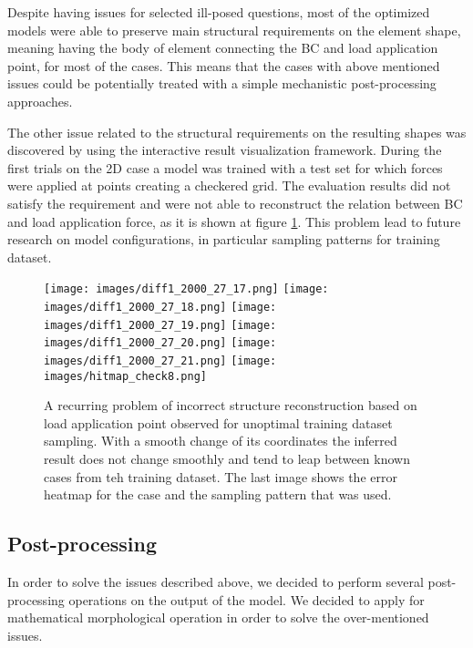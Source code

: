 Despite having issues for selected ill-posed questions, most of the optimized models were able to preserve main structural requirements on the element shape, meaning having the body of element connecting the BC and load application point, for most of the cases.
This means that the cases with above mentioned issues could be potentially treated with a simple mechanistic post-processing approaches.
\medskip

The other issue related to the structural requirements on the resulting shapes was discovered by using the interactive result visualization framework.
During the first trials on the 2D case a model was trained with a test set for which forces were applied at points creating a checkered grid.
The evaluation results did not satisfy the requirement and were not able to reconstruct the relation between BC and load application force, as it is shown at figure \ref{fig:slide_problem}.
This problem lead to future research on model configurations, in particular sampling patterns for training dataset.

\begin{figure}[h]
	\begin{multicols}{6}
		\texttt{[image: images/diff1\_2000\_27\_17.png]}
		\texttt{[image: images/diff1\_2000\_27\_18.png]}
		\texttt{[image: images/diff1\_2000\_27\_19.png]}
		\texttt{[image: images/diff1\_2000\_27\_20.png]}
		\texttt{[image: images/diff1\_2000\_27\_21.png]}
		\texttt{[image: images/hitmap\_check8.png]}	
	\end{multicols}
\caption{A recurring problem of incorrect structure reconstruction based on load application point observed for unoptimal training dataset sampling. With a smooth change of its coordinates the inferred result does not change smoothly and tend to leap between known cases from teh training dataset. The last image shows the error heatmap for the case and the sampling pattern that was used.}
\label{fig:slide_problem}
\end{figure}


\subsection{Post-processing}

In order to solve the issues described above, we decided to perform several post-processing operations on the output of the model.
We decided to apply for mathematical morphological operation in order to solve the over-mentioned issues.
\medskip

